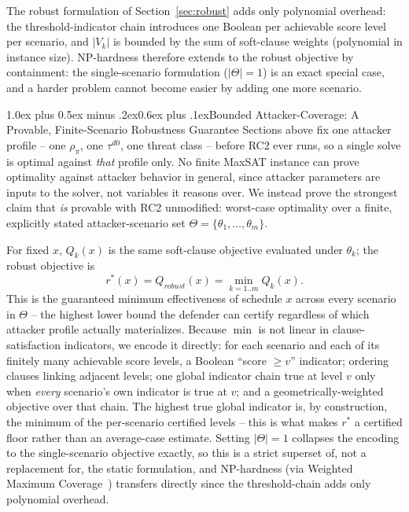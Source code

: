 \documentclass[10pt,twocolumn]{article}
\makeatletter
\renewcommand{\section}{\@startsection{section}{1}{0pt}%
  {1.0ex plus 0.5ex minus .2ex}{0.6ex plus .1ex}{\normalfont\large\bfseries}}
\makeatother
\begin{document}
The robust formulation of Section~\ref{sec:robust} adds only polynomial overhead: the threshold-indicator chain introduces one Boolean per achievable score level per scenario, and $|V_k|$ is bounded by the sum of soft-clause weights (polynomial in instance size). NP-hardness therefore extends to the robust objective by containment: the single-scenario formulation ($|\Theta|{=}1$) is an exact special case, and a harder problem cannot become easier by adding one more scenario.

\section{Bounded Attacker-Coverage: A Provable, Finite-Scenario Robustness Guarantee}\label{sec:robust}
Sections above fix one attacker profile -- one $\rho_\pi$, one $\tau^{d0}$, one threat class -- before RC2 ever runs, so a single solve is optimal against \emph{that} profile only. No finite MaxSAT instance can prove optimality against attacker behavior in general, since attacker parameters are inputs to the solver, not variables it reasons over. We instead prove the strongest claim that \emph{is} provable with RC2 unmodified: worst-case optimality over a finite, explicitly stated attacker-scenario set $\Theta=\{\theta_1,\dots,\theta_m\}$.

For fixed $x$, $Q_k(x)$ is the same soft-clause objective evaluated under $\theta_k$; the robust objective is
\[
r^*(x)=Q_{robust}(x)=\min_{k=1..m} Q_k(x).
\]
This is the guaranteed minimum effectiveness of schedule $x$ across every scenario in $\Theta$ -- the highest lower bound the defender can certify regardless of which attacker profile actually materializes. Because $\min$ is not linear in clause-satisfaction indicators, we encode it directly: for each scenario and each of its finitely many achievable score levels, a Boolean ``score $\geq v$'' indicator; ordering clauses linking adjacent levels; one global indicator chain true at level $v$ only when \emph{every} scenario's own indicator is true at $v$; and a geometrically-weighted objective over that chain. The highest true global indicator is, by construction, the minimum of the per-scenario certified levels -- this is what makes $r^*$ a certified floor rather than an average-case estimate. Setting $|\Theta|{=}1$ collapses the encoding to the single-scenario objective exactly, so this is a strict superset of, not a replacement for, the static formulation, and NP-hardness (via Weighted Maximum Coverage~\cite{feige1998}) transfers directly since the threshold-chain adds only polynomial overhead.
\end{document}
